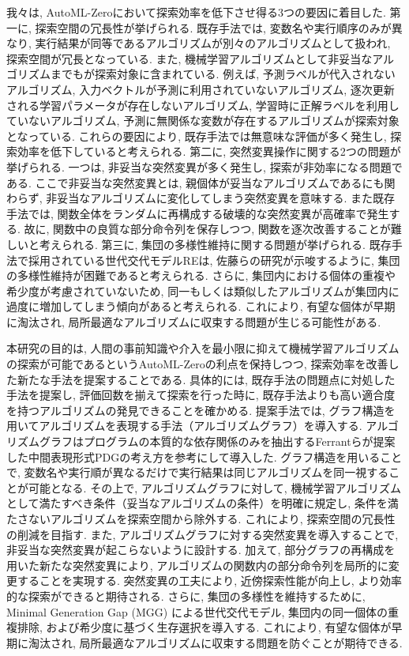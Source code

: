 \documentclass[11pt,oneside,openany,report]{jsbook}
\begin{document}
我々は, AutoML-Zeroにおいて探索効率を低下させ得る3つの要因に着目した. 第一に, 探索空間の冗長性が挙げられる. 既存手法では, 変数名や実行順序のみが異なり, 実行結果が同等であるアルゴリズムが別々のアルゴリズムとして扱われ, 探索空間が冗長となっている. また, 機械学習アルゴリズムとして非妥当なアルゴリズムまでもが探索対象に含まれている. 例えば, 予測ラベルが代入されないアルゴリズム, 入力ベクトルが予測に利用されていないアルゴリズム, 逐次更新される学習パラメータが存在しないアルゴリズム, 学習時に正解ラベルを利用していないアルゴリズム, 予測に無関係な変数が存在するアルゴリズムが探索対象となっている. これらの要因により, 既存手法では無意味な評価が多く発生し, 探索効率を低下していると考えられる. 第二に, 突然変異操作に関する2つの問題が挙げられる. 一つは, 非妥当な突然変異が多く発生し, 探索が非効率になる問題である. ここで非妥当な突然変異とは, 親個体が妥当なアルゴリズムであるにも関わらず, 非妥当なアルゴリズムに変化してしまう突然変異を意味する. また既存手法では, 関数全体をランダムに再構成する破壊的な突然変異が高確率で発生する. 故に, 関数中の良質な部分命令列を保存しつつ, 関数を逐次改善することが難しいと考えられる. 第三に, 集団の多様性維持に関する問題が挙げられる. 既存手法で採用されている世代交代モデルREは, 佐藤らの研究が示唆するように, 集団の多様性維持が困難であると考えられる\cite{mgg}. さらに, 集団内における個体の重複や希少度が考慮されていないため, 同一もしくは類似したアルゴリズムが集団内に過度に増加してしまう傾向があると考えられる. これにより, 有望な個体が早期に淘汰され, 局所最適なアルゴリズムに収束する問題が生じる可能性がある.

本研究の目的は, 人間の事前知識や介入を最小限に抑えて機械学習アルゴリズムの探索が可能であるというAutoML-Zeroの利点を保持しつつ, 探索効率を改善した新たな手法を提案することである. 具体的には, 既存手法の問題点に対処した手法を提案し, 評価回数を揃えて探索を行った時に, 既存手法よりも高い適合度を持つアルゴリズムの発見できることを確かめる. 提案手法では, グラフ構造を用いてアルゴリズムを表現する手法（アルゴリズムグラフ）を導入する. アルゴリズムグラフはプログラムの本質的な依存関係のみを抽出するFerrantらが提案した中間表現形式PDGの考え方を参考にして導入した\cite{vag}. グラフ構造を用いることで, 変数名や実行順が異なるだけで実行結果は同じアルゴリズムを同一視することが可能となる. その上で, アルゴリズムグラフに対して, 機械学習アルゴリズムとして満たすべき条件（妥当なアルゴリズムの条件）を明確に規定し, 条件を満たさないアルゴリズムを探索空間から除外する. これにより, 探索空間の冗長性の削減を目指す. また, アルゴリズムグラフに対する突然変異を導入することで, 非妥当な突然変異が起こらないように設計する. 加えて, 部分グラフの再構成を用いた新たな突然変異により, アルゴリズムの関数内の部分命令列を局所的に変更することを実現する. 突然変異の工夫により, 近傍探索性能が向上し, より効率的な探索ができると期待される. さらに, 集団の多様性を維持するために, Minimal Generation Gap (MGG) \cite{mgg}による世代交代モデル, 集団内の同一個体の重複排除, および希少度に基づく生存選択を導入する. これにより, 有望な個体が早期に淘汰され, 局所最適なアルゴリズムに収束する問題を防ぐことが期待できる.
\end{document}
